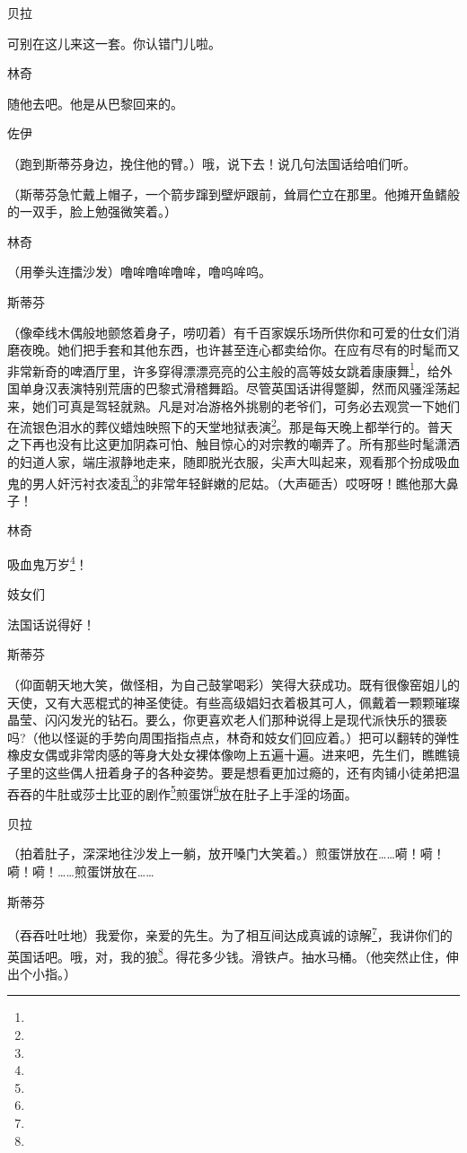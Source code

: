 \par 贝拉
\par 可别在这儿来这一套。你认错门儿啦。
\par 林奇
\par 随他去吧。他是从巴黎回来的。
\par 佐伊
\par （跑到斯蒂芬身边，挽住他的臂。）哦，说下去！说几句法国话给咱们听。
\par （斯蒂芬急忙戴上帽子，一个箭步蹿到壁炉跟前，耸肩伫立在那里。他摊开鱼鳍般的一双手，脸上勉强微笑着。）
\par 林奇
\par （用拳头连擂沙发）噜哞噜哞噜哞，噜呜哞呜。
\par 斯蒂芬
\par （像牵线木偶般地颤悠着身子，唠叨着）有千百家娱乐场所供你和可爱的仕女们消磨夜晚。她们把手套和其他东西，也许甚至连心都卖给你。在应有尽有的时髦而又非常新奇的啤酒厅里，许多穿得漂漂亮亮的公主般的高等妓女跳着康康舞\footnote{}，给外国单身汉表演特别荒唐的巴黎式滑稽舞蹈。尽管英国话讲得蹩脚，然而风骚淫荡起来，她们可真是驾轻就熟。凡是对冶游格外挑剔的老爷们，可务必去观赏一下她们在流银色泪水的葬仪蜡烛映照下的天堂地狱表演\footnote{}。那是每天晚上都举行的。普天之下再也没有比这更加阴森可怕、触目惊心的对宗教的嘲弄了。所有那些时髦潇洒的妇道人家，端庄淑静地走来，随即脱光衣服，尖声大叫起来，观看那个扮成吸血鬼的男人奸污衬衣凌乱\footnote{}的非常年轻鲜嫩的尼姑。（大声砸舌）哎呀呀！瞧他那大鼻子！
\par 林奇
\par 吸血鬼万岁\footnote{}！
\par 妓女们
\par 法国话说得好！
\par 斯蒂芬
\par （仰面朝天地大笑，做怪相，为自己鼓掌喝彩）笑得大获成功。既有很像窑姐儿的天使，又有大恶棍式的神圣使徒。有些高级娼妇衣着极其可人，佩戴着一颗颗璀璨晶莹、闪闪发光的钻石。要么，你更喜欢老人们那种说得上是现代派快乐的猥亵吗?（他以怪诞的手势向周围指指点点，林奇和妓女们回应着。）把可以翻转的弹性橡皮女偶或非常肉感的等身大处女裸体像吻上五遍十遍。进来吧，先生们，瞧瞧镜子里的这些偶人扭着身子的各种姿势。要是想看更加过瘾的，还有肉铺小徒弟把温吞吞的牛肚或莎士比亚的剧作\footnote{}煎蛋饼\footnote{}放在肚子上手淫的场面。
\par 贝拉
\par （拍着肚子，深深地往沙发上一躺，放开嗓门大笑着。）煎蛋饼放在……嗬！嗬！嗬！嗬！……煎蛋饼放在……
\par 斯蒂芬
\par （吞吞吐吐地）我爱你，亲爱的先生。为了相互间达成真诚的谅解\footnote{}，我讲你们的英国话吧。哦，对，我的狼\footnote{}。得花多少钱。滑铁卢。抽水马桶。（他突然止住，伸出个小指。）
